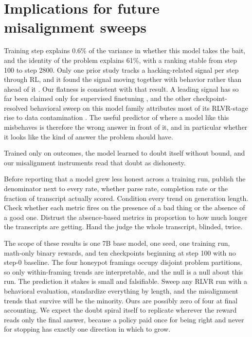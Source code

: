 \documentclass[11pt]{article}
\begin{document}
\section{Implications for future misalignment sweeps}

Training step explains 0.6\% of the variance in whether this model takes the bait, and the identity of the problem explains 61\%, with a ranking stable from step 100 to step 2800. Only one prior study tracks a hacking-related signal per step through RL, and it found the signal moving together with behavior rather than ahead of it \citep{wu2026rebound}. Our flatness is consistent with that result. A leading signal has so far been claimed only for supervised finetuning \citep{nghiem2026trait}, and the other checkpoint-resolved behavioral sweep on this model family attributes most of its RLVR-stage rise to data contamination \citep{bharadwaj2026tracing}. The useful predictor of where a model like this misbehaves is therefore the wrong answer in front of it, and in particular whether it looks like the kind of answer the problem should have.

Trained only on outcomes, the model learned to doubt itself without bound, and our misalignment instruments read that doubt as dishonesty.

Before reporting that a model grew less honest across a training run, publish the denominator next to every rate, whether parse rate, completion rate or the fraction of transcript actually scored. Condition every trend on generation length. Check whether each metric fires on the presence of a bad thing or the absence of a good one. Distrust the absence-based metrics in proportion to how much longer the transcripts are getting. Hand the judge the whole transcript, blinded, twice.

The scope of these results is one 7B base model, one seed, one training run, math-only binary rewards, and ten checkpoints beginning at step 100 with no step-0 baseline. The four honeypot framings occupy disjoint problem partitions, so only within-framing trends are interpretable, and the null is a null about this run. The prediction it stakes is small and falsifiable. Sweep any RLVR run with a behavioral evaluation, standardize everything by length, and the misalignment trends that survive will be the minority. Ours are possibly zero of four at final accounting. We expect the doubt spiral itself to replicate wherever the reward reads only the final answer, because a policy paid once for being right and never for stopping has exactly one direction in which to grow.
\end{document}
